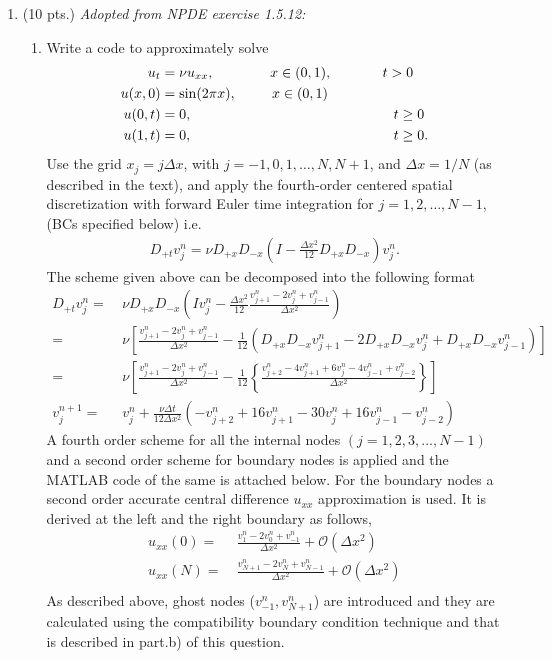 \documentclass[11pt]{article}
\newcommand{\Dpt}{D_{+t}}
\newcommand{\Dpx}{D_{+x}}
\newcommand{\Dmx}{D_{-x}}
\newcommand{\Oc}{\mathcal{O}}
\newcommand{\dx}{\Delta x}
\newcommand{\dt}{\Delta t}
\newcommand{\vnpj}{v^{n+1}_j}
\newcommand{\vnjp}{v^n_{j+1}}
\newcommand{\vnjm}{v^n_{j-1}}
\newcommand{\vnj}{v^n_j}
\newcommand{\vnjpp}{v^n_{j+2}}
\newcommand{\vnjmm}{v^n_{j-2}}
\begin{document}
\begin{enumerate}
\begin{enumerate}
  \end{enumerate}
  
  \item(10 pts.) {\color{red}\em Adopted from NPDE exercise 1.5.12:}
  \begin{enumerate}
    \item {\color{blue}Write a code to approximately solve }
      \begin{align*}
        u_t & = \nu u_{xx}, \qquad\qquad x\in(0,1), \hspace{0.5in} t>0\\
        u(x,0) & = \sin(2\pi x), \hspace{.35in} x\in(0,1)\\
        u(0,t) & = 0, \hspace{2in} t\ge 0 \\
        u(1,t) & = 0, \hspace{2in} t\ge 0.
      \end{align*}
      {\color{blue}Use the grid} $x_j=j\Delta x$, {\color{blue}with} $j=-1,0,1,\ldots,N,N+1${\color{blue}, and }$\Delta x = 1/N$ {\color{blue}(as described in the text), and apply the fourth-order centered spatial discretization with forward Euler time integration for }$j=1,2,\ldots,N-1${\color{blue}, (BCs specified below) i.e.}
      \begin{align*}
        \Dpt v_j^n = \nu\Dpx\Dmx\left(I-\frac{\dx^2}{12}\Dpx\Dmx\right) v_j^n.
      \end{align*}
     The scheme given above can be decomposed into the following format
     \begin{align*}
     \Dpt\vnj = & \ \nu \Dpx\Dmx\left(I\vnj - \frac{\dx^2}{12}\frac{\vnjp -2\vnj + \vnjm}{\dx^2}\right) \\
     = & \ \nu \left[\frac{\vnjp -2\vnj + \vnjm}{\dx^2} -\frac{1}{12}\left(\Dpx\Dmx\vnjp -2\Dpx\Dmx \vnj + \Dpx\Dmx \vnjm\right)\right] \\
     = & \ \nu\left[\frac{\vnjp -2\vnj + \vnjm}{\dx^2}  -\frac{1}{12} \left\{\frac{\vnjpp -4\vnjp + 6\vnj -4\vnjm + \vnjmm}{\dx^2} \right\} \right] \\
     \vnpj = & \ \vnj + \frac{\nu \dt}{12 \dx^2}\left(-\vnjpp + 16\vnjp -30\vnj + 16\vnjm - \vnjmm \right)
     \end{align*}
      A fourth order scheme for all the internal nodes $(j=1,2,3,...,N-1)$and a second order scheme for boundary nodes is applied and the MATLAB code of the same is attached below. For the boundary nodes a second order accurate central difference $u_{xx}$ approximation is used. It is derived at the left and the right boundary as follows,
      \begin{align*}
      u_{xx}(0) = & \ \frac{v^n_{1}-2v^n_0+v^n_{-1}}{\dx^2} + \Oc(\dx^2)\\
      u_{xx}(N) = &\ \frac{v^n_{N+1} - 2v^n_N + v^n_{N-1}}{\dx^2} + \Oc(\dx^2)\\  
      \end{align*}
      As described above, ghost nodes ($v^n_{-1}, v^n_{N+1}$) are introduced and they are calculated using the compatibility boundary condition technique and that is described in part.b) of this question.  
      

\end{enumerate}
\end{enumerate}
\end{document}
